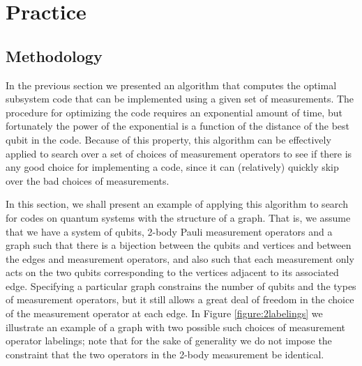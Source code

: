 \documentclass[12pt]{amsbook}
\theoremstyle{plain}
\theoremstyle{definition}
\theoremstyle{remark}
\begin{document}
\chapter{Practice} \label{sec:lattice}
\section{Methodology} \label{sec:methodology}

In the previous section we presented an algorithm that computes the optimal subsystem code that can be implemented using a given set of measurements.  The procedure for optimizing the code requires an exponential amount of time, but fortunately the power of the exponential is a function of the distance of the best qubit in the code.   Because of this property, this algorithm can be effectively applied to search over a set of choices of measurement operators to see if there is any good choice for implementing a code, since it can (relatively) quickly skip over the bad choices of measurements.

In this section, we shall present an example of applying this algorithm to search for codes on quantum systems with the structure of a graph.  That is, we assume that we have a system of qubits, 2-body Pauli measurement operators and a graph such that there is a bijection between the qubits and vertices and between the edges and measurement operators, and also such that each measurement only acts on the two qubits corresponding to the vertices adjacent to its associated edge.  Specifying a particular graph constrains the number of qubits and the types of measurement operators, but it still allows a great deal of freedom in the choice of the measurement operator at each edge.  In Figure \ref{figure:2labelings} we illustrate an example of a graph with two possible such choices of measurement operator labelings;  note that for the sake of generality we do not impose the constraint that the two operators in the 2-body measurement be identical.
\end{document}
